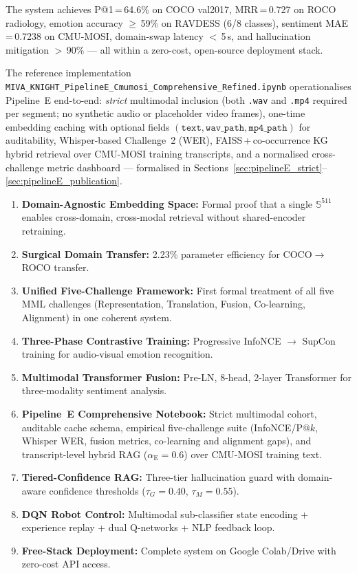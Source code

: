 \documentclass[12pt,a4paper]{article}
\theoremstyle{definition}
\theoremstyle{plain}
\theoremstyle{remark}
\newcommand{\Sph}{\mathbb{S}}
\begin{document}
The system achieves P@1\,=\,64.6\% on COCO val2017, MRR\,=\,0.727 on ROCO radiology, emotion accuracy $\geq$\,59\% on RAVDESS (6/8 classes), sentiment MAE\,=\,0.7238 on CMU-MOSI, domain-swap latency $<$\,5\,s, and hallucination mitigation $>$\,90\% --- all within a zero-cost, open-source deployment stack.

The reference implementation \texttt{MIVA\_KNIGHT\_PipelineE\_Cmumosi\_Comprehensive\_Refined.ipynb} operationalises Pipeline~E end-to-end: \emph{strict} multimodal inclusion (both \texttt{.wav} and \texttt{.mp4} required per segment; no synthetic audio or placeholder video frames), one-time embedding caching with optional fields $(\texttt{text}, \texttt{wav\_path}, \texttt{mp4\_path})$ for auditability, Whisper-based Challenge~2 (WER), FAISS\,+\,co-occurrence KG hybrid retrieval over CMU-MOSI training transcripts, and a normalised cross-challenge metric dashboard --- formalised in Sections~\ref{sec:pipelineE_strict}--\ref{sec:pipelineE_publication}.

\begin{tcolorbox}[keybox,title={Summary of Contributions}]
\begin{enumerate}[label=\textbf{C\arabic*.}]
  \item \textbf{Domain-Agnostic Embedding Space:} Formal proof that a single $\Sph^{511}$ enables cross-domain, cross-modal retrieval without shared-encoder retraining.
  \item \textbf{Surgical Domain Transfer:} 2.23\% parameter efficiency for COCO$\to$ROCO transfer.
  \item \textbf{Unified Five-Challenge Framework:} First formal treatment of all five MML challenges (Representation, Translation, Fusion, Co-learning, Alignment) in one coherent system.
  \item \textbf{Three-Phase Contrastive Training:} Progressive InfoNCE $\to$ SupCon training for audio-visual emotion recognition.
  \item \textbf{Multimodal Transformer Fusion:} Pre-LN, 8-head, 2-layer Transformer for three-modality sentiment analysis.
  \item \textbf{Pipeline~E Comprehensive Notebook:} Strict multimodal cohort, auditable cache schema, empirical five-challenge suite (InfoNCE/P@$k$, Whisper WER, fusion metrics, co-learning and alignment gaps), and transcript-level hybrid RAG ($\alpha_{\text{E}}=0.6$) over CMU-MOSI training text.
  \item \textbf{Tiered-Confidence RAG:} Three-tier hallucination guard with domain-aware confidence thresholds ($\tau_G=0.40$, $\tau_M=0.55$).
  \item \textbf{DQN Robot Control:} Multimodal sub-classifier state encoding + experience replay + dual Q-networks + NLP feedback loop.
  \item \textbf{Free-Stack Deployment:} Complete system on Google Colab/Drive with zero-cost API access.
\end{enumerate}
\end{tcolorbox}
\end{document}
